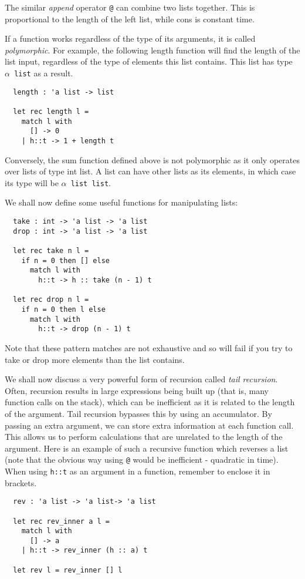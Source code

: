 \documentclass[12pt]{article}
\begin{document}
The similar \textit{append} operator \texttt{@} can combine two lists together. This is proportional to the length of the left list,
while cons is constant time.

If a function works regardless of the type of its arguments, it is called \textit{polymorphic}. For example, the following length
function will find the length of the list input, regardless of the type of elements this list contains. This list has type \texttt{$\alpha$ list} as
a result.
\begin{lstlisting}
  length : 'a list -> list

  let rec length l =
    match l with
      [] -> 0
    | h::t -> 1 + length t
\end{lstlisting}
Conversely, the sum function defined above is not polymorphic as it only operates over lists of type int list. A list can have
other lists as its elements, in which case its type will be \texttt{$\alpha$ list list}.

We shall now define some useful functions for manipulating lists:
\begin{lstlisting}
  take : int -> 'a list -> 'a list
  drop : int -> 'a list -> 'a list

  let rec take n l =
    if n = 0 then [] else
      match l with
        h::t -> h :: take (n - 1) t

  let rec drop n l =
    if n = 0 then l else
      match l with
        h::t -> drop (n - 1) t
\end{lstlisting}
Note that these pattern matches are not exhaustive and so will fail if you try to take or drop more elements than the list
contains.

We shall now discuss a very powerful form of recursion called \textit{tail recursion}. Often, recursion results in
large expressions being built up (that is, many function calls on the stack), which can be inefficient as it is related to the
length of the argument. Tail recursion
bypasses this by using an accumulator. By passing an extra argument, we can store extra information at each function
call. This allows us to perform calculations that are unrelated to the length of the argument. Here is an example of
such a recursive function which reverses a list (note that the obvious way using \texttt{@} would be inefficient - quadratic in time).
When using \texttt{h::t} as an argument in a function, remember to enclose it in brackets.
\begin{lstlisting}
  rev : 'a list -> 'a list-> 'a list

  let rec rev_inner a l =
    match l with
      [] -> a
    | h::t -> rev_inner (h :: a) t

  let rev l = rev_inner [] l
\end{lstlisting}
\end{document}
